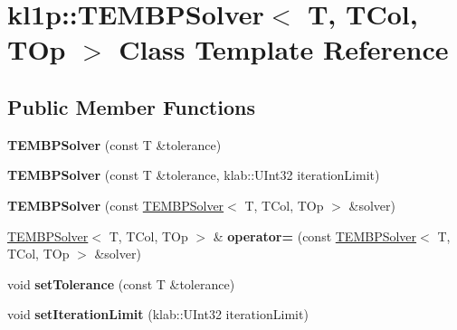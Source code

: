 \hypertarget{classkl1p_1_1TEMBPSolver}{}\section{kl1p\+:\+:T\+E\+M\+B\+P\+Solver$<$ T, T\+Col, T\+Op $>$ Class Template Reference}
\label{classkl1p_1_1TEMBPSolver}
\subsection*{Public Member Functions}
\begin{DoxyCompactItemize}
\item 
{\bfseries T\+E\+M\+B\+P\+Solver} (const T \&tolerance)\hypertarget{classkl1p_1_1TEMBPSolver_a856117ea2047cd66894f103bc944d1b3}{}\label{classkl1p_1_1TEMBPSolver_a856117ea2047cd66894f103bc944d1b3}

\item 
{\bfseries T\+E\+M\+B\+P\+Solver} (const T \&tolerance, klab\+::\+U\+Int32 iteration\+Limit)\hypertarget{classkl1p_1_1TEMBPSolver_a0b8ab5ee3a713057bcf31cbe909f7051}{}\label{classkl1p_1_1TEMBPSolver_a0b8ab5ee3a713057bcf31cbe909f7051}

\item 
{\bfseries T\+E\+M\+B\+P\+Solver} (const \hyperlink{classkl1p_1_1TEMBPSolver}{T\+E\+M\+B\+P\+Solver}$<$ T, T\+Col, T\+Op $>$ \&solver)\hypertarget{classkl1p_1_1TEMBPSolver_af88bc940a84ec4f402dd1d4e75426a07}{}\label{classkl1p_1_1TEMBPSolver_af88bc940a84ec4f402dd1d4e75426a07}

\item 
\hyperlink{classkl1p_1_1TEMBPSolver}{T\+E\+M\+B\+P\+Solver}$<$ T, T\+Col, T\+Op $>$ \& {\bfseries operator=} (const \hyperlink{classkl1p_1_1TEMBPSolver}{T\+E\+M\+B\+P\+Solver}$<$ T, T\+Col, T\+Op $>$ \&solver)\hypertarget{classkl1p_1_1TEMBPSolver_a86d10121f5ea67f7270ae9b5968789e2}{}\label{classkl1p_1_1TEMBPSolver_a86d10121f5ea67f7270ae9b5968789e2}

\item 
void {\bfseries set\+Tolerance} (const T \&tolerance)\hypertarget{classkl1p_1_1TEMBPSolver_a8eb376dcd7004e98e11a6c6c2da26210}{}\label{classkl1p_1_1TEMBPSolver_a8eb376dcd7004e98e11a6c6c2da26210}

\item 
void {\bfseries set\+Iteration\+Limit} (klab\+::\+U\+Int32 iteration\+Limit)\hypertarget{classkl1p_1_1TEMBPSolver_a646a17e2d77557d905efeec9b3107a20}{}\label{classkl1p_1_1TEMBPSolver_a646a17e2d77557d905efeec9b3107a20}


\end{DoxyCompactItemize}
